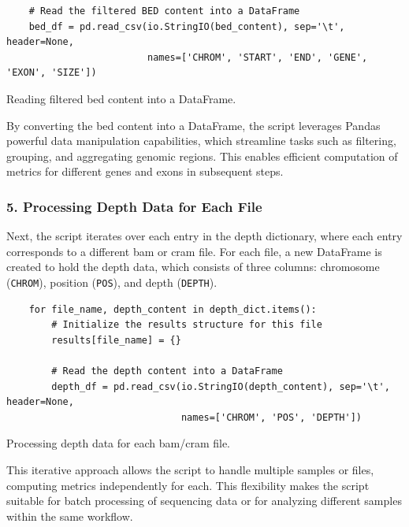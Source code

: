 \begin{longlisting}
\begin{verbatim}
    # Read the filtered BED content into a DataFrame
    bed_df = pd.read_csv(io.StringIO(bed_content), sep='\t', header=None,
                         names=['CHROM', 'START', 'END', 'GENE', 'EXON', 'SIZE'])
\end{verbatim}
\caption{Reading filtered \ac{bed} content into a DataFrame.}
\label{lbl:metrics_bed_df}
\end{longlisting}

By converting the \ac{bed} content into a DataFrame, the script leverages Pandas powerful data manipulation capabilities, which streamline tasks such as filtering, grouping, and aggregating genomic regions. This enables efficient computation of metrics for different genes and exons in subsequent steps.

\subsubsection{\textbf{5. Processing Depth Data for Each File}}

Next, the script iterates over each entry in the depth dictionary, where each entry corresponds to a different \ac{bam} or \ac{cram} file. For each file, a new DataFrame is created to hold the depth data, which consists of three columns: chromosome (\texttt{CHROM}), position (\texttt{POS}), and depth (\texttt{DEPTH}).

\begin{longlisting}
\begin{verbatim}
    for file_name, depth_content in depth_dict.items():
        # Initialize the results structure for this file
        results[file_name] = {}
        
        # Read the depth content into a DataFrame
        depth_df = pd.read_csv(io.StringIO(depth_content), sep='\t', header=None,
                               names=['CHROM', 'POS', 'DEPTH'])
\end{verbatim}
\caption{Processing depth data for each \ac{bam}/\ac{cram} file.}
\label{lbl:metrics_depth_df}
\end{longlisting}

This iterative approach allows the script to handle multiple samples or files, computing metrics independently for each. This flexibility makes the script suitable for batch processing of sequencing data or for analyzing different samples within the same workflow.

